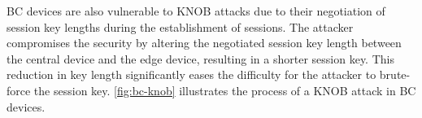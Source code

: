 BC devices are  also vulnerable to KNOB attacks due to their negotiation of session key lengths during the establishment of sessions.
The attacker compromises the security by altering the negotiated session key length between the central device and the edge device, resulting in a shorter session key. This reduction in key length significantly eases the difficulty for the attacker to brute-force the session key.
\autoref{fig:bc-knob} illustrates the process of a KNOB attack in BC devices.


